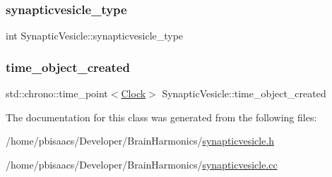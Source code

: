 \mbox{\label{classSynapticVesicle_a568770c79ad49a55129076a1bc625db2}} 
\subsubsection{\texorpdfstring{synapticvesicle\+\_\+type}{synapticvesicle\_type}}
{\footnotesize\ttfamily int Synaptic\+Vesicle\+::synapticvesicle\+\_\+type\hspace{0.3cm}{\ttfamily [private]}}

\mbox{\label{classSynapticVesicle_af025ff605f37a683bd4a00d9140a217b}} 
\subsubsection{\texorpdfstring{time\+\_\+object\+\_\+created}{time\_object\_created}}
{\footnotesize\ttfamily std\+::chrono\+::time\+\_\+point$<$\mbox{\hyperlink{universe_8h_a0ef8d951d1ca5ab3cfaf7ab4c7a6fd80}{Clock}}$>$ Synaptic\+Vesicle\+::time\+\_\+object\+\_\+created\hspace{0.3cm}{\ttfamily [private]}}



The documentation for this class was generated from the following files\+:\begin{DoxyCompactItemize}
\item 
/home/pbisaacs/\+Developer/\+Brain\+Harmonics/\mbox{\hyperlink{synapticvesicle_8h}{synapticvesicle.\+h}}\item 
/home/pbisaacs/\+Developer/\+Brain\+Harmonics/\mbox{\hyperlink{synapticvesicle_8cc}{synapticvesicle.\+cc}}\end{DoxyCompactItemize}
